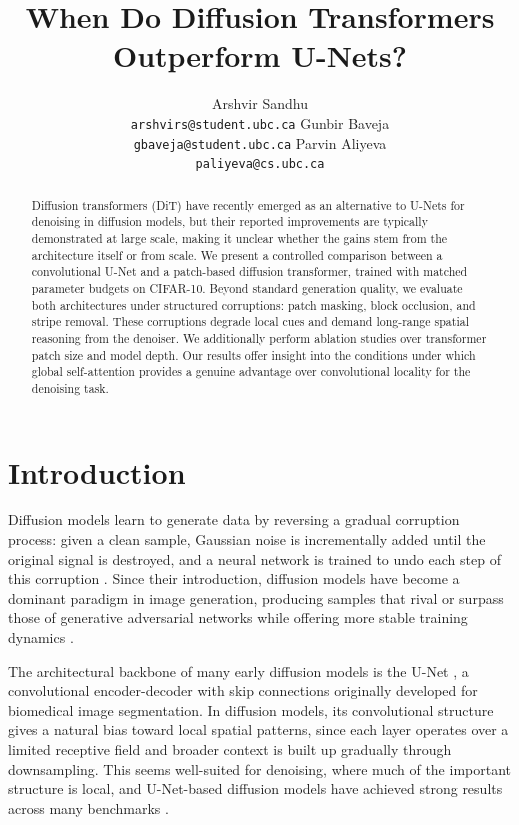 \documentclass{article}
\title{When Do Diffusion Transformers Outperform U-Nets?}
\author{%
Arshvir Sandhu\\
  \texttt{arshvirs@student.ubc.ca}
  \And
  Gunbir Baveja\\
  \texttt{gbaveja@student.ubc.ca}
  \And
  Parvin Aliyeva\\
  \texttt{paliyeva@cs.ubc.ca}
}
\begin{document}
\maketitle


\begin{abstract}
    
    Diffusion transformers (DiT) have recently emerged as an alternative to U-Nets for denoising in diffusion models, but their reported improvements are typically demonstrated at large scale, making it unclear whether the gains stem from the architecture itself or from scale.
    We present a controlled comparison between a convolutional U-Net and a patch-based diffusion transformer, trained with matched parameter budgets on CIFAR-10.
    Beyond standard generation quality, we evaluate both architectures under structured corruptions: patch masking, block occlusion, and stripe removal. 
    These corruptions degrade local cues and demand long-range spatial reasoning from the denoiser.
    We additionally perform ablation studies over transformer patch size and model depth.
    Our results offer insight into the conditions under which global self-attention provides a genuine advantage over convolutional locality for the denoising task.
    
\end{abstract}


\section{Introduction}

Diffusion models learn to generate data by reversing a gradual corruption process: given a clean sample, Gaussian noise is incrementally added until the original signal is destroyed, and a neural network is trained to undo each step of this corruption \citep{ho2020ddpm}. 
Since their introduction, diffusion models have become a dominant paradigm in image generation, producing samples that rival or surpass those of generative adversarial networks while offering more stable training dynamics \citep{dhariwal2021diffusionbeat}.

The architectural backbone of many early diffusion models is the U-Net \citep{ronneberger2015unet}, a convolutional encoder-decoder with skip connections originally developed for biomedical image segmentation.
In diffusion models, its convolutional structure gives a natural bias toward local spatial patterns, since each layer operates over a limited receptive field and broader context is built up gradually through downsampling.
This seems well-suited for denoising, where much of the important structure is local, and U-Net-based diffusion models have achieved strong results across many benchmarks \citep{ho2020ddpm, rombach2022ldm}.
\end{document}
